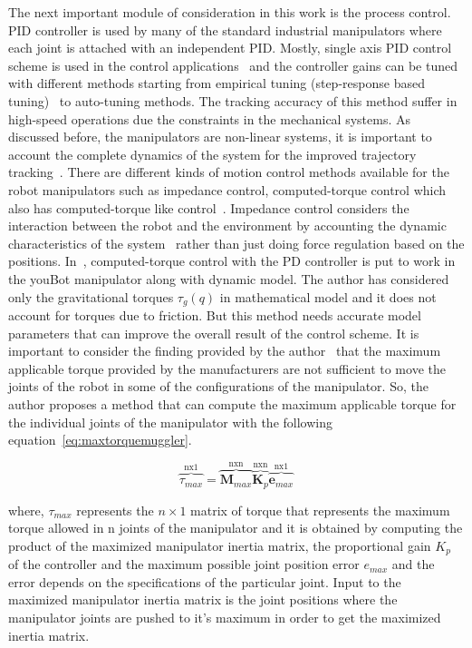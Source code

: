 The next important module of consideration in this work is the process control. PID controller is used by many of the standard industrial manipulators where each joint is attached with an independent PID. Mostly, single axis PID control scheme is used in the control applications~\cite{cascadedcontrol} and the controller gains can be tuned with different methods starting from empirical tuning (step-response based tuning)~\cite{astrom1995pid} to auto-tuning methods. The tracking accuracy of this method suffer in high-speed operations due the constraints in the mechanical systems. As discussed before, the manipulators are non-linear systems, it is important to account the complete dynamics of the system for the improved trajectory tracking~\cite{swevers}. There are different kinds of motion control methods available for the robot manipulators such as impedance control, computed-torque control which also has computed-torque like control~\cite{Chung2016}. Impedance control considers the interaction between the robot and the environment by accounting the dynamic characteristics of the system~\cite{de2012theory} rather than just doing force regulation based on the positions. In~\cite{muggler2013torque}, computed-torque control with the PD controller is put to work in the youBot manipulator along with dynamic model. The author has considered only the gravitational torques $\tau_g(q)$ in mathematical model and it does not account for torques due to friction. But this method needs accurate model parameters that can improve the overall result of the control scheme. It is important to consider the finding provided by the author~\cite{muggler2013torque} that the maximum applicable torque provided by the manufacturers are not sufficient to move the joints of the robot in some of the configurations of the manipulator. So, the author proposes a method that can compute the maximum applicable torque for the individual joints of the manipulator with the following equation~\eqref{eq:maxtorquemuggler}.

\begin{equation}
	\overbrace{\tau_{max}}^\text{nx1} = \overbrace{\textbf{M}_{max}}^\text{nxn} \overbrace{\textbf{K}_p}^\text{nxn} \overbrace{\textbf{e}_{max}}^\text{nx1}
\label{eq:maxtorquemuggler}
\end{equation}

where, $\tau_{max}$ represents the $n\times1$ matrix of torque that represents the maximum torque allowed in n joints of the manipulator and it is obtained by computing the product of the maximized manipulator inertia matrix, the proportional gain $K_p$ of the controller and the maximum possible joint position error $e_{max}$ and the error depends on the specifications of the particular joint. Input to the maximized manipulator inertia matrix is the joint positions where the manipulator joints are pushed to it's maximum in order to get the maximized inertia matrix. 

